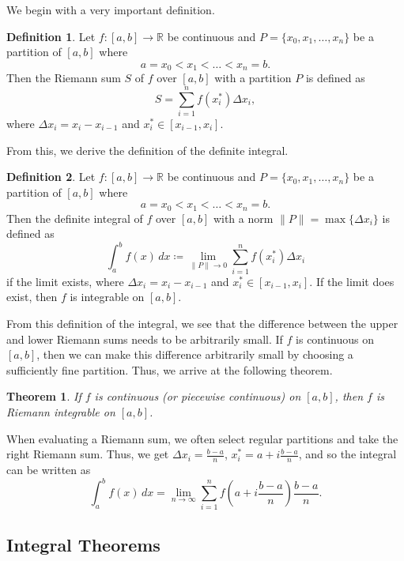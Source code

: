 \documentclass[11pt]{scrartcl}
\theoremstyle{plain}
\newtheorem{theorem}{Theorem}[section]
\theoremstyle{definition}
\newtheorem*{definition}{Definition}
\theoremstyle{remark}
\begin{document}
We begin with a very important definition.

\begin{definition}
    Let $f\colon[a,b]\to \mathbb{R}$ be continuous and $P=\{x_{0},x_{1},\dots,x_{n}\}$ be a partition of $[a,b]$ where
    \[ a=x_{0}<x_{1}<\dots<x_{n}=b. \]
    Then the Riemann sum $S$ of $f$ over $[a,b]$ with a partition $P$ is defined as
    \[ S=\sum_{i=1}^n f(x_{i}^*)\Delta x_{i}, \]
    where $\Delta x_{i}=x_{i}-x_{i-1}$ and $x_{i}^*\in[x_{i-1},x_{i}]$. 
\end{definition}

From this, we derive the definition of the definite integral.

\begin{definition}
    Let $f\colon[a,b]\to \mathbb{R}$ be continuous and $P=\{x_{0},x_{1},\dots,x_{n}\}$ be a partition of $[a,b]$ where
    \[ a=x_{0}<x_{1}<\dots<x_{n}=b. \]
    Then the definite integral of $f$ over $[a,b]$ with a norm $\lVert P \rVert=\max\{\Delta x_{i}\}$ is defined as
    \[ \int_{a}^{b} f(x) \, dx \coloneqq \lim_{ \lVert P \rVert  \to 0 } \sum_{i=1}^n f(x_{i}^*)\Delta x_{i} \]
    if the limit exists, where $\Delta x_{i}=x_{i}-x_{i-1}$ and $x_{i}^*\in[x_{i-1},x_{i}]$. If the limit does exist, then $f$ is integrable on $[a,b]$.
\end{definition}

From this definition of the integral, we see that the difference between the upper and lower Riemann sums needs to be arbitrarily small. If $f$ is continuous on $[a,b]$, then we can make this difference arbitrarily small by choosing a sufficiently fine partition. Thus, we arrive at the following theorem.

\begin{theorem}
    If $f$ is continuous (or piecewise continuous) on $[a,b]$, then $f$ is Riemann integrable on $[a,b]$. 
\end{theorem}

When evaluating a Riemann sum, we often select regular partitions and take the right Riemann sum. Thus, we get $\Delta x_{i}=\frac{{b-a}}{n}$, $x_{i}^*=a+i \frac{{b-a}}{n}$, and so the integral can be written as
\[ \int_{a}^{b} f(x) \, dx =\lim_{ n \to \infty } \sum_{i=1}^n f\left( a+i \frac{{b-a}}{n} \right) \frac{{b-a}}{n}. \]

\subsection{Integral Theorems}
\end{document}
